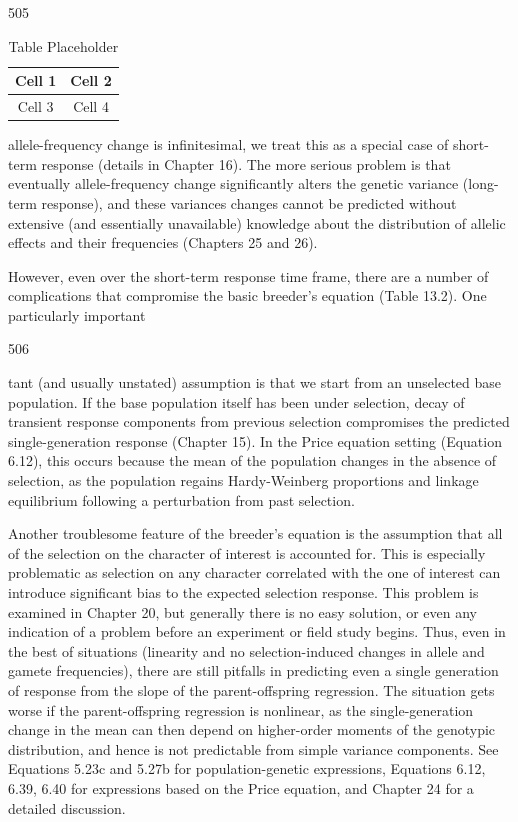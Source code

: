 \documentclass{article}
\begin{document}
505

\begin{table}[h]
\centering
\begin{tabular}{|c|c|}
\hline
Cell 1 & Cell 2 \\
\hline
Cell 3 & Cell 4 \\
\hline
\end{tabular}
\caption{Table Placeholder}
\end{table}

allele-frequency change is infinitesimal, we treat this as a special case of short-term response (details in Chapter 16). The more serious problem is that eventually allele-frequency change significantly alters the genetic variance (long-term response), and these variances changes cannot be predicted without extensive (and essentially unavailable) knowledge about the distribution of allelic effects and their frequencies (Chapters 25 and 26).

However, even over the short-term response time frame, there are a number of complications that compromise the basic breeder's equation (Table 13.2). One particularly important

506

tant (and usually unstated) assumption is that we start from an unselected base population. If the base population itself has been under selection, decay of transient response components from previous selection compromises the predicted single-generation response (Chapter 15). In the Price equation setting (Equation 6.12), this occurs because the mean of the population changes in the absence of selection, as the population regains Hardy-Weinberg proportions and linkage equilibrium following a perturbation from past selection.

Another troublesome feature of the breeder's equation is the assumption that all of the selection on the character of interest is accounted for. This is especially problematic as selection on any character correlated with the one of interest can introduce significant bias to the expected selection response. This problem is examined in Chapter 20, but generally there is no easy solution, or even any indication of a problem before an experiment or field study begins. Thus, even in the best of situations (linearity and no selection-induced changes in allele and gamete frequencies), there are still pitfalls in predicting even a single generation of response from the slope of the parent-offspring regression. The situation gets worse if the parent-offspring regression is nonlinear, as the single-generation change in the mean can then depend on higher-order moments of the genotypic distribution, and hence is not predictable from simple variance components. See Equations 5.23c and 5.27b for population-genetic expressions, Equations 6.12, 6.39, 6.40 for expressions based on the Price equation, and Chapter 24 for a detailed discussion.
\end{document}

